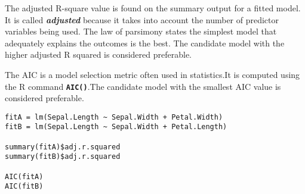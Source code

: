 \documentclass[a4paper,12pt]{article}
\begin{document}
\noindent The adjusted R-square value is found on the summary output for a fitted model. It is called \textbf{\emph{adjusted}} because it takes into account the number of predictor variables being used. The law of parsimony states the simplest model that adequately explains the outcomes is the best. The candidate model with the higher adjusted R squared is considered preferable.


\noindent The AIC is a model selection metric often used in statistics.It is computed using the R command
\texttt{\textbf{AIC()}}.The candidate model with the smallest AIC value is considered preferable.

\begin{framed}
\begin{verbatim}
fitA = lm(Sepal.Length ~ Sepal.Width + Petal.Width)
fitB = lm(Sepal.Length ~ Sepal.Width + Petal.Length)

summary(fitA)$adj.r.squared
summary(fitB)$adj.r.squared

AIC(fitA)
AIC(fitB)
\end{verbatim}
\end{framed}




\end{document}
